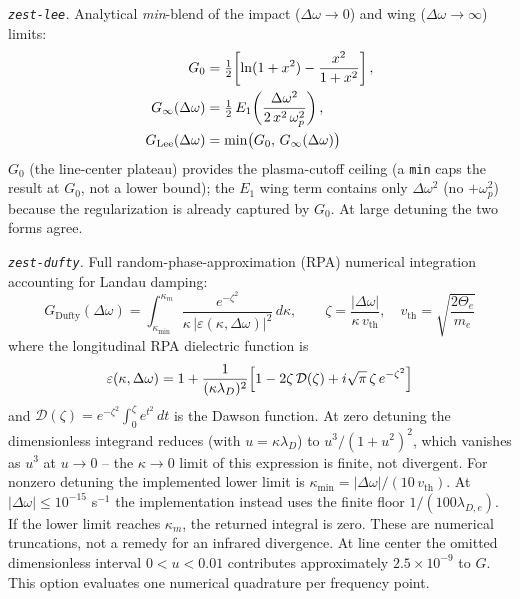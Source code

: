 \documentclass[11pt,a4paper]{article}
\numberwithin{equation}{section}
\begin{document}
\medskip
\textit{\texttt{zest-lee}.}
Analytical \emph{min}-blend of the impact ($\Delta\omega \to 0$) and wing ($\Delta\omega \to \infty$) limits:
\begin{align}
G_0 &= \tfrac{1}{2}\!\left[\ln(1+x^2) - \frac{x^2}{1+x^2}\right], \notag\\
G_\infty(\Delta\omega) &= \tfrac{1}{2}\,E_1\!\left(\frac{\Delta\omega^2}{2\,x^2\,\omega_p^2}\right), \notag\\
G_\mathrm{Lee}(\Delta\omega) &= \min\bigl(G_0,\,G_\infty(\Delta\omega)\bigr)
\label{eq:G_lee}
\end{align}
$G_0$ (the line-center plateau) provides the plasma-cutoff ceiling (a \texttt{min} caps the result at $G_0$, not a lower bound); the $E_1$ wing term contains
only $\Delta\omega^2$ (no $+\omega_p^2$) because the regularization is already captured by $G_0$.
At large detuning the two forms agree.

\medskip
\textit{\texttt{zest-dufty}.}
Full random-phase-approximation (RPA) numerical integration accounting for Landau damping:
\begin{equation}
\label{eq:G_dufty}
G_\mathrm{Dufty}(\Delta\omega) = \int_{\kappa_\mathrm{min}}^{\kappa_m}
  \frac{e^{-\zeta^2}}{\kappa\,|\varepsilon(\kappa,\Delta\omega)|^2}\,d\kappa,
\qquad \zeta = \frac{|\Delta\omega|}{\kappa\,v_\mathrm{th}},
\quad v_\mathrm{th} = \sqrt{\frac{2\Theta_e}{m_e}}
\end{equation}
where the longitudinal RPA dielectric function is
\begin{equation}
\varepsilon(\kappa,\Delta\omega)
  = 1 + \frac{1}{(\kappa\lambda_D)^2}
    \Bigl[1 - 2\zeta\,\mathcal{D}(\zeta) + i\sqrt{\pi}\,\zeta\,e^{-\zeta^2}\Bigr]
\end{equation}
and $\mathcal{D}(\zeta) = e^{-\zeta^2}\!\int_0^\zeta e^{t^2}\,dt$ is the Dawson function.
At zero detuning the dimensionless integrand reduces (with $u=\kappa\lambda_D$) to
$u^3/(1+u^2)^2$, which vanishes as $u^3$ at $u\to0$ -- the $\kappa\to0$ limit of this
expression is finite, not divergent. For nonzero detuning the implemented lower
limit is $\kappa_\mathrm{min} = |\Delta\omega|/(10\,v_\mathrm{th})$.
At $|\Delta\omega|\le10^{-15}$ s$^{-1}$ the implementation instead uses the
finite floor $1/(100\lambda_{D,e})$. If the lower limit reaches $\kappa_m$,
the returned integral is zero. These are numerical truncations, not a remedy
for an infrared divergence. At line center the omitted dimensionless interval
$0<u<0.01$ contributes approximately $2.5\times10^{-9}$ to $G$.
This option evaluates one numerical quadrature per frequency point.
\end{document}
